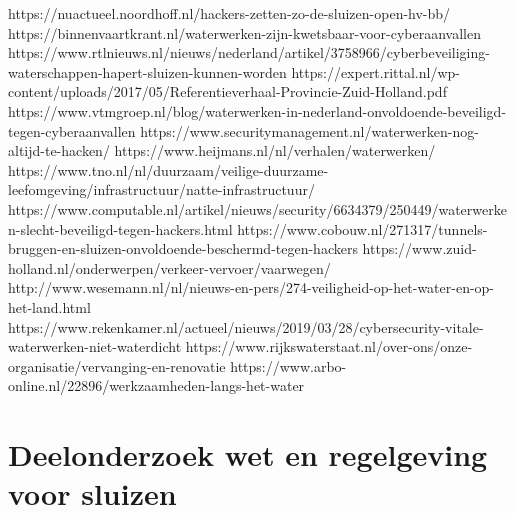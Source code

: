 https://nuactueel.noordhoff.nl/hackers-zetten-zo-de-sluizen-open-hv-bb/
https://binnenvaartkrant.nl/waterwerken-zijn-kwetsbaar-voor-cyberaanvallen
https://www.rtlnieuws.nl/nieuws/nederland/artikel/3758966/cyberbeveiliging-waterschappen-hapert-sluizen-kunnen-worden
https://expert.rittal.nl/wp-content/uploads/2017/05/Referentieverhaal-Provincie-Zuid-Holland.pdf
https://www.vtmgroep.nl/blog/waterwerken-in-nederland-onvoldoende-beveiligd-tegen-cyberaanvallen
https://www.securitymanagement.nl/waterwerken-nog-altijd-te-hacken/
https://www.heijmans.nl/nl/verhalen/waterwerken/
https://www.tno.nl/nl/duurzaam/veilige-duurzame-leefomgeving/infrastructuur/natte-infrastructuur/
https://www.computable.nl/artikel/nieuws/security/6634379/250449/waterwerken-slecht-beveiligd-tegen-hackers.html
https://www.cobouw.nl/271317/tunnels-bruggen-en-sluizen-onvoldoende-beschermd-tegen-hackers
https://www.zuid-holland.nl/onderwerpen/verkeer-vervoer/vaarwegen/
http://www.wesemann.nl/nl/nieuws-en-pers/274-veiligheid-op-het-water-en-op-het-land.html
https://www.rekenkamer.nl/actueel/nieuws/2019/03/28/cybersecurity-vitale-waterwerken-niet-waterdicht
https://www.rijkswaterstaat.nl/over-ons/onze-organisatie/vervanging-en-renovatie
https://www.arbo-online.nl/22896/werkzaamheden-langs-het-water


\chapter{Deelonderzoek wet en regelgeving voor sluizen}



